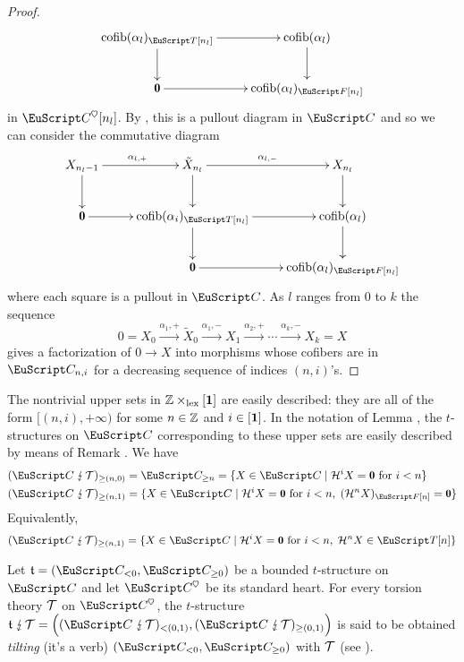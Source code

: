 \begin{proof}
\[
\xymatrix{
\cofib(\alpha_l)_{\cate{T}[n_l]}\ar[d]\ar[r]& \cofib(\alpha_l)\ar[d]\\
\zero\ar[r]& \cofib(\alpha_l)_{\cate{F}[n_l]}
}
\]
in $\C^\heart[n_l]$. By \aprop{}, this is a pullout diagram in $\C$ and so we can consider the commutative diagram
\[
\xymatrix{
X_{n_l-1}\ar[r]^{\alpha_{l,+}}\ar[d] & \tilde{X}_{n_l}\ar[d]\ar[r]^{\alpha_{l,-}}&X_{n_l}\ar[d]\\
 \zero\ar[r]&\cofib(\alpha_i)_{\cate{T}[n_l]}\ar[d]\ar[r]& \cofib(\alpha_l)\ar[d]\\
& \zero\ar[r]& \cofib(\alpha_l)_{\cate{F}[n_l]}
}
\]
where each square is a pullout in $\C$. As $l$ ranges from $0$ to $k$  {\color{green!40!black} the sequence
$$0=X_0 \xrightarrow{\alpha_1,+}\tilde{X}_0 \xrightarrow{\alpha_1,-}X_1\xrightarrow{\alpha_2,+} \cdots \xrightarrow{\alpha_k,-} X_k=X$$
}
gives a factorization of $0\to X$ into morphisms whose cofibers are in $\C_{n,i}$ for a decreasing sequence of indices $(n,i)$'s.
\end{proof}
\begin{remark}\label{rem.explicit.tilt}
The nontrivial upper sets in $\mathbb{Z} \times_{\mathrm{lex}} [\mathbf{1}]$ are easily described: they are all of the form $[(n,i),+\infty)$ for some $n\in \mathbb{Z}$ and $i\in [\mathbf{1}]$. In the notation of Lemma , the $t$-structures on $\C$ corresponding to these upper sets are easily described by means of Remark . We have
\begin{align*}
(\C\tilted\T)_{\geq (n,0)} &=\C_{\geq n}=\{X \in \C \mid \mathcal{H}^iX=\zero \text{ for } i<n\}\\
(\C\tilted\T)_{\geq (n,1)} &=\{X \in \C \mid \mathcal{H}^iX=\zero \text{ for } i<n, \; (\mathcal{H}^nX)_{\cate{F}[n]}=\zero\}
\end{align*}
Equivalently,
\[
(\C\tilted\T)_{\geq (n,1)}=\{X \in \C \mid \mathcal{H}^iX=\zero \text{ for } i<n,\; \mathcal{H}^nX\in \cate{T}[n]\}
\] 
\end{remark}

\begin{definition}\label{def.tilting}
Let $\tee=(\C_{<0},\C_{\ge 0})$ be a bounded $t$-structure on $\C$ and let $\C^\heart$ be its standard heart. For every torsion theory $\mathcal{T}$ on $\C^\heart$, the $t$-structure $\tee\tilted\T  = \Big((\C\tilted\T)_{< (0,1)} , (\C\tilted\T)_{\ge (0,1)}\Big)$ is said to be obtained \emph{tilting} (it's a verb) $(\C_{ < 0},\C_{\ge 0})$ with $\mathcal{T}$ (see \cite{Beligiannisreiten}).
\end{definition}

